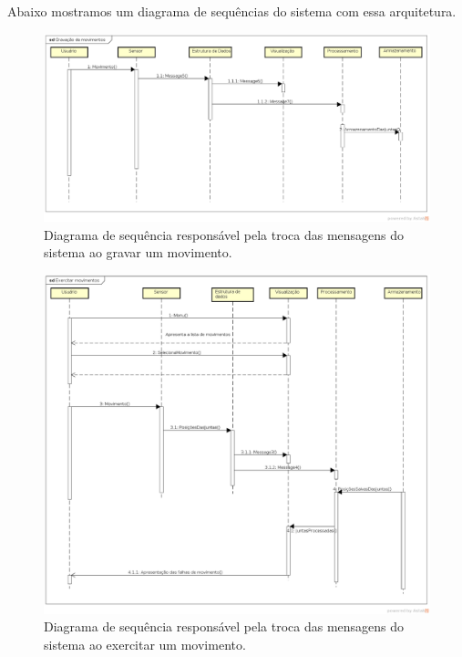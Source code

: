 Abaixo mostramos um diagrama de sequências do sistema com essa arquitetura.

\begin{figure}[H]
\centering
\includegraphics [keepaspectratio=true,scale=0.37]{figuras/dsPythonGravacao.eps}
\caption{Diagrama de sequência responsável pela troca das mensagens do sistema ao gravar um movimento.}
\label{img:dspythong}
\end{figure}

\begin{figure}[H]
\centering
\includegraphics [keepaspectratio=true,scale=0.38]{figuras/dsPythonExecitar.eps}
\caption{Diagrama de sequência responsável pela troca das mensagens do sistema ao exercitar um movimento.}
\label{img:dspythone}
\end{figure}



